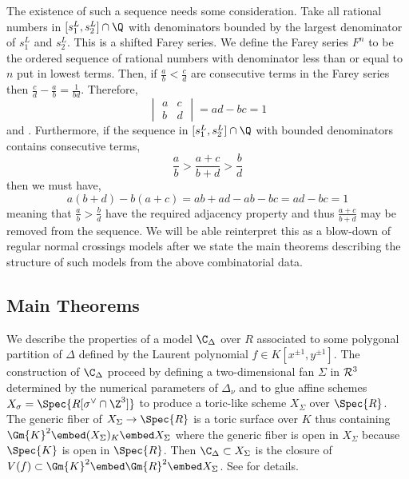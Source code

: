 \begin{rmk}
The existence of such a sequence needs some consideration. Take all rational numbers in $[s_1^L, s_2^L] \cap \Q$ with denominators bounded by the largest denominator of $s_1^L$ and $s_2^L$. This is a shifted Farey series. We define the Farey series $F^n$ to be the ordered sequence of rational numbers with denominator less than or equal to $n$ put in lowest terms. Then, if $\frac{a}{b} < \frac{c}{d}$ are consecutive terms in the Farey series then $\frac{c}{d} - \frac{a}{b} = \frac{1}{bd}$. Therefore,
\[ \begin{vmatrix}
a & c 
\\
b & d 
\end{vmatrix}
= ad - bc = 1 \] 
\cite[Remark 3.15]{tim} and \cite[Ch. III, Thm. 28, Thm. 29]{HW}.
Furthermore, if the sequence in $[s_1^L, s_2^L] \cap \Q$ with bounded denominators contains consecutive terms,
\[ \frac{a}{b} > \frac{a + c}{b + d} > \frac{b}{d} \]
then we must have,
\[ a(b + d) - b(a + c) = ab + ad - ab - bc = ad - bc = 1 \]
meaning that $\frac{a}{b} > \frac{b}{d}$ have the required adjacency property and thus $\frac{a + c}{b + d}$ may be removed from the sequence. We will be able reinterpret this as a blow-down of regular normal crossings models after we state the main theorems describing the structure of such models from the above combinatorial data.
\end{rmk}

\subsection{Main Theorems}

We describe the properties of a model $\C_\Delta$ over $R$ associated to some polygonal partition of $\Delta$ defined by the Laurent polynomial $f \in K[x^{\pm 1}, y^{\pm 1}]$. The construction of $\C_\Delta$ proceed by defining a two-dimensional fan $\Sigma$ in $\mathcal{R}^3$ determined by the numerical parameters of $\Delta_\nu$ and to glue affine schemes $X_\sigma = \Spec{R[\sigma^\vee \cap \Z^3]}$ to produce a toric-like scheme $X_\Sigma$ over $\Spec{R}$. The generic fiber of $X_\Sigma \to \Spec{R}$ is a toric surface over $K$ thus containing $\Gm{K}^2 \embed (X_\Sigma)_K \embed X_\Sigma$ where the generic fiber is open in $X_\Sigma$ because $\Spec{K}$ is open in $\Spec{R}$. Then $\C_\Delta \subset X_\Sigma$ is the closure of $V(f) \subset \Gm{K}^2 \embed \Gm{R}^2 \embed X_\Sigma$. See \cite[Section 4]{tim} for details.

